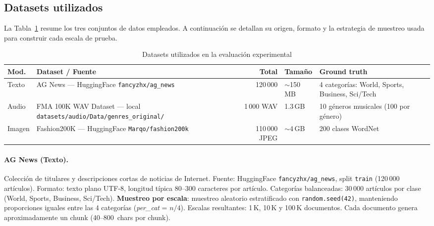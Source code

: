 \documentclass[12pt,a4paper]{article}
\begin{document}
\subsection{Datasets utilizados}

La Tabla~\ref{tab:datasets} resume los tres conjuntos de datos empleados.
A continuación se detallan su origen, formato y la estrategia de muestreo
usada para construir cada escala de prueba.

\begin{table}[H]
  \centering
  \caption{Datasets utilizados en la evaluación experimental}
  \label{tab:datasets}
  \begin{tabular}{lp{4.5cm}rp{2cm}p{3.5cm}}
    \toprule
    \textbf{Mod.} & \textbf{Dataset / Fuente} & \textbf{Total} & \textbf{Tamaño} & \textbf{Ground truth} \\
    \midrule
    Texto  & AG News — HuggingFace \texttt{fancyzhx/ag\_news}
           & 120\,000 & $\sim$150\,MB & 4 categorías: World, Sports, Business, Sci/Tech \\
    \midrule
    Audio  & FMA 100K WAV Dataset — local \texttt{datasets/audio/Data/genres\_original/}
           & 1\,000 WAV & 1.3\,GB & 10 géneros musicales (100 por género) \\
    \midrule
    Imagen & Fashion200K — HuggingFace \texttt{Marqo/fashion200k}
           & 110\,000 JPEG & $\sim$4\,GB & 200 clases WordNet \\
    \bottomrule
  \end{tabular}
\end{table}

\paragraph{AG News (Texto).}
Colección de titulares y descripciones cortas de noticias de Internet.
Fuente: HuggingFace \texttt{fancyzhx/ag\_news}, split \texttt{train} (120\,000 artículos).
Formato: texto plano UTF-8, longitud típica 80--300 caracteres por artículo.
Categorías balanceadas: 30\,000 artículos por clase
(World, Sports, Business, Sci/Tech).
\textbf{Muestreo por escala}: muestreo aleatorio estratificado con
\texttt{random.seed(42)}, manteniendo proporciones iguales entre las 4 categorías
(\textit{per\_cat} = $n/4$). Escalas resultantes: 1\,K, 10\,K y 100\,K documentos.
Cada documento genera aproximadamente un chunk (40--800~chars por chunk).
\end{document}
